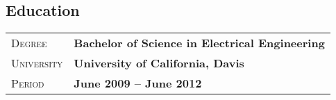 \documentclass[a4paper, oneside, final]{scrartcl}
\newcommand{\gray}{\rowcolor[gray]{.90}} %
\begin{document}
\begin{center}

\section{Education}
\begin{tabularx}{0.97\linewidth}{>{\raggedleft\scshape}p{2cm}X}
\gray Degree & \textbf{Bachelor of Science in Electrical Engineering}\\
\gray University & \textbf{University of California, Davis} \\
\gray Period & \textbf{June 2009 -- June 2012}\\
\end{tabularx}


\end{center}
\end{document}
